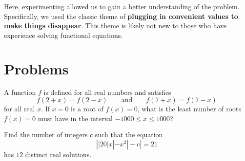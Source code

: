 \documentclass[mast]{lucky}
\begin{document}
\bigskip

Here, experimenting allowed us to gain a better understanding of the problem. Specifically, we used the classic theme of \textbf{plugging in convenient values to make things disappear}. This theme is likely not new to those who have experience solving functional equations.

\pagebreak\section{Problems}


\begin{prob}[AIME 1984/12]{4}
A function $f$ is defined for all real numbers and satisfies\[f(2 + x) = f(2 - x)\qquad\text{and}\qquad f(7 + x) = f(7 - x)\]for all real $x$. If $x = 0$ is a root of $f(x) = 0$, what is the least number of roots $f(x) = 0$ must have in the interval $-1000 \le x \le 1000$?
\end{prob}

\begin{prob}[AIME I 2021/8]{6}
Find the number of integers $c$ such that the equation$$\left||20|x|-x^2|-c\right|=21$$has $12$ distinct real solutions.
\end{prob}
\end{document}
